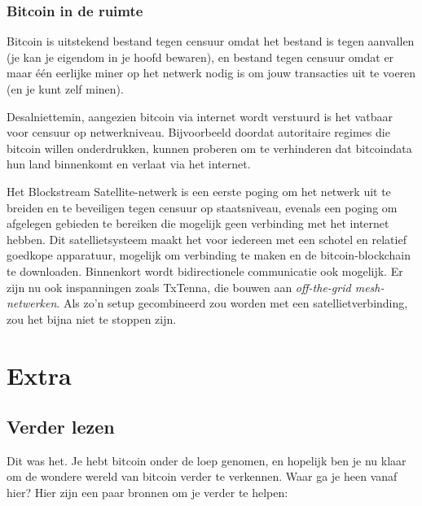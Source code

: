 \documentclass[
  letterpaper,
]{scrbook}
\begin{document}
\hypertarget{bitcoin-in-de-ruimte}{%
\section{Bitcoin in de ruimte}\label{bitcoin-in-de-ruimte}}

Bitcoin is uitstekend bestand tegen censuur omdat het bestand is tegen
aanvallen (je kan je eigendom in je hoofd bewaren), en bestand tegen
censuur omdat er maar één eerlijke miner op het netwerk nodig is om jouw
transacties uit te voeren (en je kunt zelf minen).

Desalniettemin, aangezien bitcoin via internet wordt verstuurd is het
vatbaar voor censuur op netwerkniveau. Bijvoorbeeld doordat autoritaire
regimes die bitcoin willen onderdrukken, kunnen proberen om te
verhinderen dat bitcoindata hun land binnenkomt en verlaat via het
internet.

Het Blockstream Satellite-netwerk is een eerste poging om het netwerk
uit te breiden en te beveiligen tegen censuur op staatsniveau, evenals
een poging om afgelegen gebieden te bereiken die mogelijk geen
verbinding met het internet hebben. Dit satellietsysteem maakt het voor
iedereen met een schotel en relatief goedkope apparatuur, mogelijk om
verbinding te maken en de bitcoin-blockchain te downloaden. Binnenkort
wordt bidirectionele communicatie ook mogelijk. Er zijn nu ook
inspanningen zoals TxTenna, die bouwen aan \emph{off-the-grid
mesh-netwerken}. Als zo'n setup gecombineerd zou worden met een
satellietverbinding, zou het bijna niet te stoppen zijn.

\part{Extra}

\hypertarget{verder-lezen}{%
\chapter*{Verder lezen}\label{verder-lezen}}


Dit was het. Je hebt bitcoin onder de loep genomen, en hopelijk ben je
nu klaar om de wondere wereld van bitcoin verder te verkennen. Waar ga
je heen vanaf hier? Hier zijn een paar bronnen om je verder te helpen:
\end{document}
